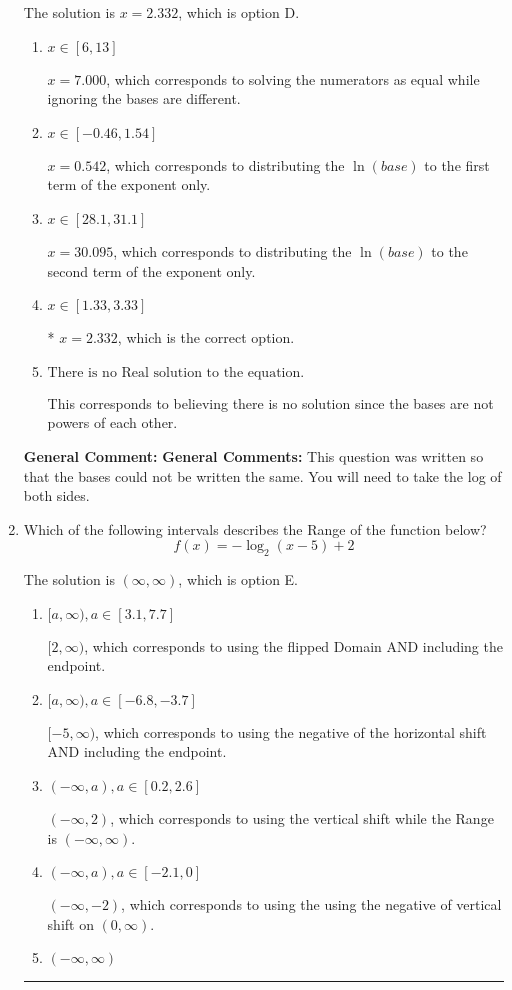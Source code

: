 \documentclass{extbook}[14pt]
\newcommand{\litem}[1]{\item #1

\rule{\textwidth}{0.4pt}}
\begin{document}
\begin{enumerate}
{The solution is \( x = 2.332 \), which is option D.\begin{enumerate}[label=\Alph*.]
\item \( x \in [6, 13] \)

$x = 7.000$, which corresponds to solving the numerators as equal while ignoring the bases are different.
\item \( x \in [-0.46, 1.54] \)

$x = 0.542$, which corresponds to distributing the $\ln(base)$ to the first term of the exponent only.
\item \( x \in [28.1, 31.1] \)

$x = 30.095$, which corresponds to distributing the $\ln(base)$ to the second term of the exponent only.
\item \( x \in [1.33, 3.33] \)

* $x = 2.332$, which is the correct option.
\item \( \text{There is no Real solution to the equation.} \)

This corresponds to believing there is no solution since the bases are not powers of each other.
\end{enumerate}

\textbf{General Comment:} \textbf{General Comments:} This question was written so that the bases could not be written the same. You will need to take the log of both sides.
}
\litem{
Which of the following intervals describes the Range of the function below?
\[ f(x) = -\log_2{(x-5)}+2 \]

The solution is \( (\infty, \infty) \), which is option E.\begin{enumerate}[label=\Alph*.]
\item \( [a, \infty), a \in [3.1, 7.7] \)

$[2, \infty)$, which corresponds to using the flipped Domain AND including the endpoint.
\item \( [a, \infty), a \in [-6.8, -3.7] \)

$[-5, \infty)$, which corresponds to using the negative of the horizontal shift AND including the endpoint.
\item \( (-\infty, a), a \in [0.2, 2.6] \)

$(-\infty, 2)$, which corresponds to using the vertical shift while the Range is $(-\infty, \infty)$.
\item \( (-\infty, a), a \in [-2.1, 0] \)

$(-\infty, -2)$, which corresponds to using the using the negative of vertical shift on $(0, \infty)$.
\item \( (-\infty, \infty) \)


\end{enumerate}}
\end{enumerate}
\end{document}
